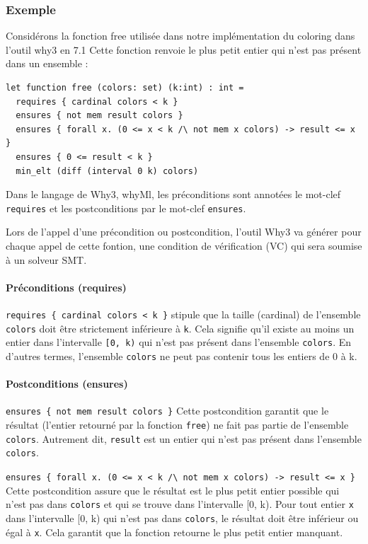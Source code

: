 \documentclass[11pt]{article}
\begin{document}
\subsubsection{Exemple}
\label{sec:orgd76cd00}
Considérons la fonction free utilisée dans notre implémentation du coloring dans l'outil why3 en 7.1
Cette fonction renvoie le plus petit entier qui n'est pas présent dans un ensemble :

\lstset{language=why3,label= ,caption= ,captionpos=b,numbers=none}
\begin{lstlisting}
let function free (colors: set) (k:int) : int =
  requires { cardinal colors < k }
  ensures { not mem result colors }
  ensures { forall x. (0 <= x < k /\ not mem x colors) -> result <= x }
  ensures { 0 <= result < k }
  min_elt (diff (interval 0 k) colors)
\end{lstlisting}
Dans le langage de Why3, whyMl, les préconditions sont annotées le mot-clef \texttt{requires} 
et les postconditions par le mot-clef \texttt{ensures}.

Lors de l'appel d'une précondition ou postcondition, l'outil Why3 va générer pour chaque appel de cette fontion, une condition de vérification (VC)
qui sera soumise à un solveur SMT.
\paragraph{Préconditions (requires)}
\label{sec:org7013cf6}


     \texttt{requires \{ cardinal colors < k \}} stipule que la taille (cardinal) 
de l'ensemble \texttt{colors} doit être strictement inférieure à \texttt{k}.
 Cela signifie qu'il existe au moins un entier dans l'intervalle \texttt{[0, k)} qui n'est pas présent dans l'ensemble \texttt{colors}. 
En d'autres termes, l'ensemble \texttt{colors} ne peut pas contenir tous les entiers de 0 à k.

\paragraph{Postconditions (ensures)}
\label{sec:orgd336cf5}


     \texttt{ensures \{ not mem result colors \}}
  Cette postcondition garantit que le résultat (l'entier retourné par la fonction \texttt{free}) ne fait pas partie de l'ensemble \texttt{colors}. 
Autrement dit, \texttt{result} est un entier qui n'est pas présent dans l'ensemble \texttt{colors}.

\texttt{ensures \{ forall x. (0 <= x < k /\textbackslash{} not mem x colors) -> result <= x \}}
  Cette postcondition assure que le résultat est le plus petit entier possible qui n'est pas dans \texttt{colors} et qui se trouve dans l'intervalle [0, k). 
Pour tout entier \texttt{x} dans l'intervalle [0, k) qui n'est pas dans \texttt{colors}, le résultat doit être inférieur ou égal à \texttt{x}. 
Cela garantit que la fonction retourne le plus petit entier manquant.
\end{document}
